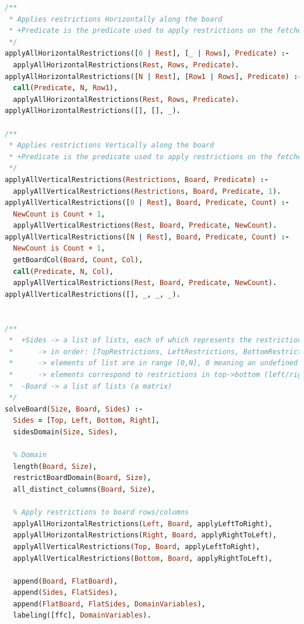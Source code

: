 \documentclass{llncs}
\begin{document}
\begin{lstlisting}[language=Prolog]
/**
 * Applies restrictions Horizontally along the board
 * +Predicate is the predicate used to apply restrictions on the fetched Row.
 */
applyAllHorizontalRestrictions([0 | Rest], [_ | Rows], Predicate) :-
  applyAllHorizontalRestrictions(Rest, Rows, Predicate).
applyAllHorizontalRestrictions([N | Rest], [Row1 | Rows], Predicate) :-
  call(Predicate, N, Row1),
  applyAllHorizontalRestrictions(Rest, Rows, Predicate).
applyAllHorizontalRestrictions([], [], _).

/**
 * Applies restrictions Vertically along the board
 * +Predicate is the predicate used to apply restrictions on the fetched Column.
 */
applyAllVerticalRestrictions(Restrictions, Board, Predicate) :-
  applyAllVerticalRestrictions(Restrictions, Board, Predicate, 1).
applyAllVerticalRestrictions([0 | Rest], Board, Predicate, Count) :-
  NewCount is Count + 1,
  applyAllVerticalRestrictions(Rest, Board, Predicate, NewCount).
applyAllVerticalRestrictions([N | Rest], Board, Predicate, Count) :-
  NewCount is Count + 1,
  getBoardCol(Board, Count, Col),
  call(Predicate, N, Col),
  applyAllVerticalRestrictions(Rest, Board, Predicate, NewCount).
applyAllVerticalRestrictions([], _, _, _).


/**
 *  +Sides -> a list of lists, each of which represents the restrictions on the side of the board (number of visible buildings).
 *      -> in order: [TopRestrictions, LeftRestrictions, BottomRestrictions, RightRestrictions]
 *      -> elements of list are in range [0,N], 0 meaning an undefined restriction
 *      -> elements correspond to restrictions in top->bottom (left/right lists) or left->right (top/bottom lists) order
 *  -Board -> a list of lists (a matrix)
 */
solveBoard(Size, Board, Sides) :-
  Sides = [Top, Left, Bottom, Right],
  sidesDomain(Size, Sides),

  % Domain
  length(Board, Size),
  restrictBoardDomain(Board, Size),
  all_distinct_columns(Board, Size),

  % Apply restrictions to board rows/columns
  applyAllHorizontalRestrictions(Left, Board, applyLeftToRight),
  applyAllHorizontalRestrictions(Right, Board, applyRightToLeft),
  applyAllVerticalRestrictions(Top, Board, applyLeftToRight),
  applyAllVerticalRestrictions(Bottom, Board, applyRightToLeft),

  append(Board, FlatBoard),
  append(Sides, FlatSides),
  append(FlatBoard, FlatSides, DomainVariables),
  labeling([ffc], DomainVariables).

\end{lstlisting}
\newpage
\end{document}
